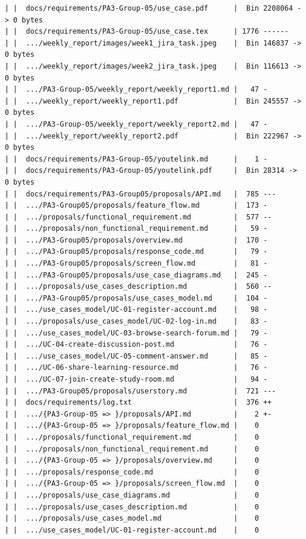 \documentclass[12pt]{article}
\begin{document}
\begin{lstlisting}[numbers=none,breaklines=true]
| |  docs/requirements/PA3-Group-05/use_case.pdf      |  Bin 2208064 -> 0 bytes
| |  docs/requirements/PA3-Group-05/use_case.tex      | 1776 ------
| |  .../weekly_report/images/week1_jira_task.jpeg    |  Bin 146837 -> 0 bytes
| |  .../weekly_report/images/week2_jira_task.jpeg    |  Bin 116613 -> 0 bytes
| |  .../PA3-Group-05/weekly_report/weekly_report1.md |   47 -
| |  .../weekly_report/weekly_report1.pdf             |  Bin 245557 -> 0 bytes
| |  .../PA3-Group-05/weekly_report/weekly_report2.md |   47 -
| |  .../weekly_report/weekly_report2.pdf             |  Bin 222967 -> 0 bytes
| |  docs/requirements/PA3-Group-05/youtelink.md      |    1 -
| |  docs/requirements/PA3-Group-05/youtelink.pdf     |  Bin 28314 -> 0 bytes
| |  docs/requirements/PA3-Group05/proposals/API.md   |  785 ---
| |  .../PA3-Group05/proposals/feature_flow.md        |  173 -
| |  .../proposals/functional_requirement.md          |  577 --
| |  .../proposals/non_functional_requirement.md      |   59 -
| |  .../PA3-Group05/proposals/overview.md            |  170 -
| |  .../PA3-Group05/proposals/response_code.md       |   79 -
| |  .../PA3-Group05/proposals/screen_flow.md         |   81 -
| |  .../PA3-Group05/proposals/use_case_diagrams.md   |  245 -
| |  .../proposals/use_cases_description.md           |  560 --
| |  .../PA3-Group05/proposals/use_cases_model.md     |  104 -
| |  .../use_cases_model/UC-01-register-account.md    |   98 -
| |  .../proposals/use_cases_model/UC-02-log-in.md    |   83 -
| |  .../use_cases_model/UC-03-browse-search-forum.md |   79 -
| |  .../UC-04-create-discussion-post.md              |   76 -
| |  .../use_cases_model/UC-05-comment-answer.md      |   85 -
| |  .../UC-06-share-learning-resource.md             |   76 -
| |  .../UC-07-join-create-study-room.md              |   94 -
| |  .../PA3-Group05/proposals/userstory.md           |  721 ---
| |  docs/requirements/log.txt                        |  376 ++
| |  .../{PA3-Group-05 => }/proposals/API.md          |    2 +-
| |  .../{PA3-Group-05 => }/proposals/feature_flow.md |    0
| |  .../proposals/functional_requirement.md          |    0
| |  .../proposals/non_functional_requirement.md      |    0
| |  .../{PA3-Group-05 => }/proposals/overview.md     |    0
| |  .../proposals/response_code.md                   |    0
| |  .../{PA3-Group-05 => }/proposals/screen_flow.md  |    0
| |  .../proposals/use_case_diagrams.md               |    0
| |  .../proposals/use_cases_description.md           |    0
| |  .../proposals/use_cases_model.md                 |    0
| |  .../use_cases_model/UC-01-register-account.md    |    0

\end{lstlisting}
\end{document}
